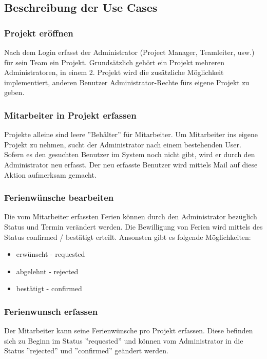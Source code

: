 \subsection{Beschreibung der Use Cases}
\subsubsection{Projekt er\"offnen}
Nach dem Login erfasst der Administrator (Project Manager, Teamleiter, usw.) f\"ur sein Team ein Projekt. Grunds\"atzlich geh\"ort ein Projekt mehreren Administratoren, in einem 2. Projekt wird die zus\"atzliche M\"oglichkeit implementiert, anderen Benutzer Administrator-Rechte f\"urs eigene Projekt zu geben.

\subsubsection{Mitarbeiter in Projekt erfassen}
Projekte alleine sind leere ''Beh\"alter'' f\"ur Mitarbeiter. Um Mitarbeiter ins eigene Projekt zu nehmen, sucht der Administrator nach einem bestehenden User. Sofern es den gesuchten Benutzer im System noch nicht gibt, wird er durch den Administrator neu erfasst. Der neu erfasste Benutzer wird mittels Mail auf diese Aktion aufmerksam gemacht.

\subsubsection{Ferienw\"unsche bearbeiten}
Die vom Mitarbeiter erfassten Ferien k\"onnen durch den Administrator bez\"uglich Status und Termin ver\"andert werden. Die Bewilligung von Ferien wird mittels des Status confirmed / best\"atigt erteilt. Ansonsten gibt es folgende M\"oglichkeiten:
\begin{itemize}
\item erw\"unscht - requested
\item abgelehnt - rejected
\item best\"atigt - confirmed
\end{itemize}

\subsubsection{Ferienwunsch erfassen}
Der Mitarbeiter kann seine Ferienw\"unsche pro Projekt erfassen. Diese befinden sich zu Beginn im Status ''requested'' und k\"onnen vom Administrator in die Status ''rejected'' und ''confirmed'' ge\"andert werden.

